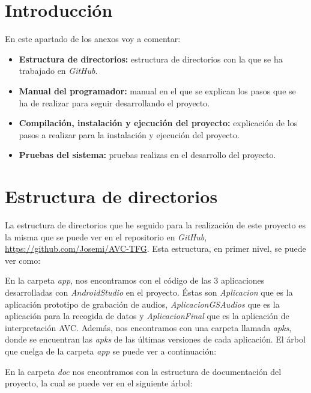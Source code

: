 
\section{Introducción}
En este apartado de los anexos voy a comentar:
\begin{itemize}
	\item \textbf{Estructura de directorios:} estructura de directorios con la que se ha trabajado en \textit{GitHub}.
	\item \textbf{Manual del programador:} manual en el que se explican los pasos que se ha de realizar para seguir desarrollando el proyecto.
	\item \textbf{Compilación, instalación y ejecución del proyecto:} explicación de los pasos a realizar para la instalación y ejecución del proyecto.
	\item \textbf{Pruebas del sistema:} pruebas realizas en el desarrollo del proyecto.
\end{itemize}
\section{Estructura de directorios}
La estructura de directorios que he seguido para la realización de este proyecto es la misma que se puede ver en el repositorio en \textit{GitHub}, \url{https://github.com/Josemi/AVC-TFG}. Esta estructura, en primer nivel, se puede ver como:

En la carpeta \textit{app}, nos encontramos con el código de las 3 aplicaciones desarrolladas con \textit{AndroidStudio} en el proyecto. Éstas son \textit{Aplicacion} que es la aplicación prototipo de grabación de audios, \textit{AplicacionGSAudios} que es la aplicación para la recogida de datos y \textit{AplicacionFinal} que es la aplicación de interpretación AVC. Además, nos encontramos con una carpeta llamada \textit{apks}, donde se encuentran las \textit{apks} de las últimas versiones de cada aplicación. El árbol que cuelga de la carpeta \textit{app} se puede ver a continuación:


En la carpeta \textit{doc} nos encontramos con la estructura de documentación del proyecto, la cual se puede ver en el siguiente árbol:

